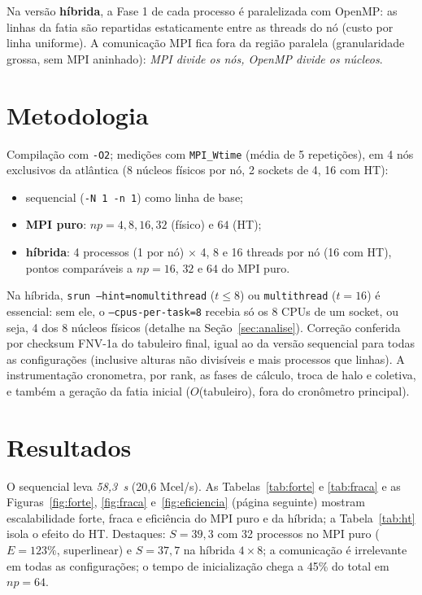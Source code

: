 \documentclass[10pt,twocolumn]{article}
\begin{document}
Na versão \textbf{híbrida}, a Fase 1 de cada processo é paralelizada com
OpenMP: as linhas da fatia são repartidas estaticamente entre as threads do
nó (custo por linha uniforme). A comunicação MPI fica fora da região
paralela (granularidade grossa, sem MPI aninhado): \emph{MPI divide os nós,
OpenMP divide os núcleos}.

\section{Metodologia}
\label{sec:metodo}

Compilação com \texttt{-O2}; medições com \texttt{MPI\_Wtime} (média de 5
repetições), em 4 nós exclusivos da atlântica (8 núcleos físicos por nó,
2 sockets de 4, 16 com HT):
\begin{itemize}\setlength{\itemsep}{0pt}
  \item sequencial (\texttt{-N 1 -n 1}) como linha de base;
  \item \textbf{MPI puro}: $np = 4, 8, 16, 32$ (físico) e $64$ (HT);
  \item \textbf{híbrida}: 4 processos (1 por nó) $\times$ 4, 8 e 16 threads
        por nó (16 com HT), pontos comparáveis a $np=16$, $32$ e $64$ do
        MPI puro.
\end{itemize}
Na híbrida, \texttt{srun --hint=nomultithread} ($t{\le}8$) ou
\texttt{multithread} ($t{=}16$) é essencial: sem ele, o
\texttt{--cpus-per-task=8} recebia só os 8 CPUs de um socket, ou seja, 4 dos 8
núcleos físicos (detalhe na Seção~\ref{sec:analise}). Correção conferida por
checksum FNV-1a do tabuleiro final, igual ao da versão sequencial para todas
as configurações (inclusive alturas não divisíveis e mais processos que
linhas). A instrumentação cronometra, por rank, as fases de cálculo, troca de
halo e coletiva, e também a geração da fatia inicial ($O$(tabuleiro), fora do
cronômetro principal).

\section{Resultados}
\label{sec:resultados}

O sequencial leva \emph{58,3~s} (20,6 Mcel/s). As Tabelas~\ref{tab:forte} e
\ref{tab:fraca} e as Figuras~\ref{fig:forte}, \ref{fig:fraca} e~\ref{fig:eficiencia} (página
seguinte) mostram escalabilidade forte, fraca e eficiência do MPI puro e da
híbrida; a Tabela~\ref{tab:ht} isola o efeito do HT. Destaques: $S = 39{,}3$
com 32 processos no MPI puro ($E = 123\%$, superlinear) e $S = 37{,}7$ na
híbrida $4{\times}8$; a comunicação é irrelevante em todas as configurações;
o tempo de inicialização chega a 45\% do total em $np=64$.
\end{document}
